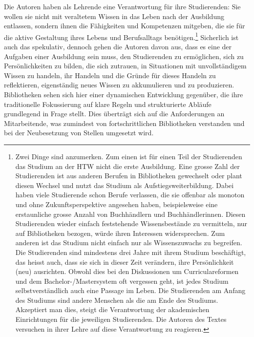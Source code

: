 \documentclass[a4paper,
fontsize=11pt,
oneside,
numbers=noperiodatend,
parskip=half-,
bibliography=totoc,
final
]{scrartcl}
\begin{document}
Die Autoren haben als Lehrende eine Verantwortung für ihre Studierenden:
Sie wollen sie nicht mit veraltetem Wissen in das Leben nach der
Ausbildung entlassen, sondern ihnen die Fähigkeiten und Kompetenzen
mitgeben, die sie für die aktive Gestaltung ihres Lebens und
Berufsalltags benötigen.\footnote{Zwei Dinge sind anzumerken. Zum einen
  ist für einen Teil der Studierenden das Studium an der HTW nicht die
  erste Ausbildung. Eine grosse Zahl der Studierenden ist aus anderen
  Berufen in Bibliotheken gewechselt oder plant diesen Wechsel und nutzt
  das Studium als Aufstiegsweiterbildung. Dabei haben viele Studierende
  schon Berufe verlassen, die sie offenbar als monoton und ohne
  Zukunftsperspektive angesehen haben, beispielsweise eine erstaunliche
  grosse Anzahl von Buchhändlern und Buchhändlerinnen. Diesen
  Studierenden wieder einfach feststehende Wissensbestände zu
  vermitteln, nur auf Bibliotheken bezogen, würde ihren Interessen
  widersprechen. Zum anderen ist das Studium nicht einfach nur als
  Wissenszuwachs zu begreifen. Die Studierenden sind mindestens drei
  Jahre mit ihrem Studium beschäftigt, das heisst auch, dass sie sich in
  dieser Zeit verändern, ihre Persönlichkeit (neu) ausrichten. Obwohl
  dies bei den Diskussionen um Curriculareformen und dem
  Bachelor-/Mastersystem oft vergessen geht, ist jedes Studium
  selbstverständlich auch eine Passage im Leben. Die Studierenden am
  Anfang des Studiums sind andere Menschen als die am Ende des Studiums.
  Akzeptiert man dies, steigt die Verantwortung der akademischen
  Einrichtungen für die jeweiligen Studierenden. Die Autoren des Textes
  versuchen in ihrer Lehre auf diese Verantwortung zu reagieren.}
Sicherlich ist auch das spekulativ, dennoch gehen die Autoren davon aus,
dass es eine der Aufgaben einer Ausbildung sein muss, den Studierenden
zu ermöglichen, sich zu Persönlichkeiten zu bilden, die sich zutrauen,
in Situationen mit unvollständigem Wissen zu handeln, ihr Handeln und
die Gründe für dieses Handeln zu reflektieren, eigenständig neues Wissen
zu akkumulieren und zu produzieren. Bibliotheken sehen sich hier einer
dynamischen Entwicklung gegenüber, die ihre traditionelle Fokussierung
auf klare Regeln und strukturierte Abläufe grundlegend in Frage stellt.
Dies überträgt sich auf die Anforderungen an Mitarbeitende, was
zumindest von fortschrittlichen Bibliotheken verstanden und bei der
Neubesetzung von Stellen umgesetzt wird.
\end{document}
